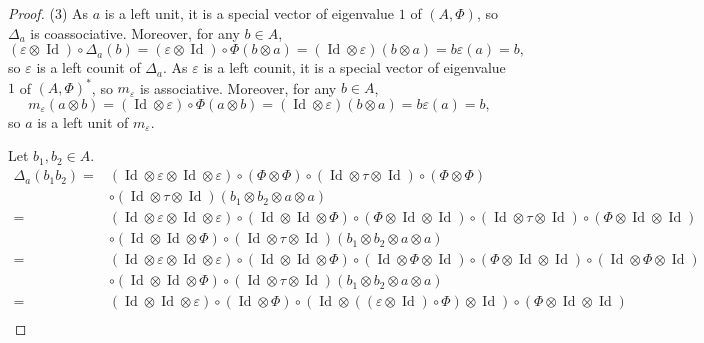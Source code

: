 \documentclass[pdftex]{sigma}
\numberwithin{equation}{section}
\begin{document}
\begin{proof}
(3) As $a$ is a left unit, it is a special vector of eigenvalue $1$ of $(A,\Phi)$, so $\Delta_a$ is coassociative. Moreover, for any $b\in A$,
\[(\varepsilon\otimes \operatorname{Id})\circ \Delta_a(b)=(\varepsilon\otimes \operatorname{Id})\circ \Phi(b\otimes a)=(\operatorname{Id} \otimes \varepsilon)(b\otimes a)=b\varepsilon(a)=b,\]
so $\varepsilon$ is a left counit of $\Delta_a$. As $\varepsilon$ is a left counit, it is a special vector of eigenvalue $1$ of $(A,\Phi)^*$, so $m_\varepsilon$ is associative. Moreover, for any $b\in A$,{\samepage
\[m_\varepsilon(a\otimes b)=(\operatorname{Id} \otimes \varepsilon)\circ \Phi(a\otimes b)=(\operatorname{Id} \otimes \varepsilon)(b\otimes a)=b\varepsilon(a)=b,\]
so $a$ is a left unit of $m_\varepsilon$.}

Let $b_1,b_2\in A$.
\begin{align*}
\Delta_a(b_1b_2)={}&(\operatorname{Id} \otimes \varepsilon\otimes \operatorname{Id} \otimes \varepsilon)\circ (\Phi\otimes \Phi)\circ (\operatorname{Id} \otimes \tau\otimes \operatorname{Id})\circ (\Phi\otimes \Phi)\\
&\circ (\operatorname{Id} \otimes \tau\otimes \operatorname{Id})(b_1\otimes b_2\otimes a\otimes a)\\
={}&(\operatorname{Id} \otimes \varepsilon\otimes \operatorname{Id} \otimes \varepsilon)\circ (\operatorname{Id} \otimes \operatorname{Id} \otimes \Phi)\circ (\Phi\otimes \operatorname{Id} \otimes \operatorname{Id})\circ (\operatorname{Id} \otimes \tau\otimes \operatorname{Id})\circ (\Phi\otimes \operatorname{Id} \otimes \operatorname{Id})\\
&\circ(\operatorname{Id} \otimes \operatorname{Id} \otimes \Phi)\circ (\operatorname{Id} \otimes \tau\otimes \operatorname{Id})(b_1\otimes b_2\otimes a\otimes a)\\
={}&(\operatorname{Id} \otimes \varepsilon\otimes \operatorname{Id} \otimes \varepsilon)\circ (\operatorname{Id} \otimes \operatorname{Id} \otimes \Phi)\circ (\operatorname{Id}\otimes \Phi \otimes \operatorname{Id})\circ (\Phi \otimes \operatorname{Id}\otimes \operatorname{Id})\circ (\operatorname{Id}\otimes \Phi\otimes \operatorname{Id})\\
&\circ(\operatorname{Id} \otimes \operatorname{Id} \otimes \Phi)\circ (\operatorname{Id} \otimes \tau\otimes \operatorname{Id})(b_1\otimes b_2\otimes a\otimes a)\\
={}&(\operatorname{Id} \otimes \operatorname{Id} \otimes \varepsilon)\circ (\operatorname{Id} \otimes \Phi)\circ (\operatorname{Id}\otimes ((\varepsilon \otimes \operatorname{Id})\circ\Phi) \otimes \operatorname{Id})\circ (\Phi \otimes \operatorname{Id}\otimes \operatorname{Id})\\

\end{align*}
\end{proof}
\end{document}
